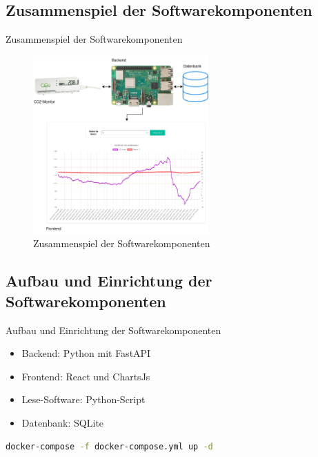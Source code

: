 \documentclass[10pt,ngerman]{beamer}
\begin{document}
\subsection{Zusammenspiel der Softwarekomponenten}

\begin{frame}[fragile]{Zusammenspiel der Softwarekomponenten}
  \begin{figure}
    \centering
    \captionsetup{justification=centering}
    \includegraphics[width=0.6\textwidth]{pictures/SoftwareZusammenspiel.png}
    \caption{Zusammenspiel der Softwarekomponenten \autocite{co2monitor}\autocite{rasPi}}
  \end{figure}
\end{frame}

\subsection{Aufbau und Einrichtung der Softwarekomponenten}

\begin{frame}[fragile]{Aufbau und Einrichtung der Softwarekomponenten}

  \begin{minipage}[t]{0.49\textwidth}
    \begin{itemize}
      \item Backend: Python mit FastAPI
      \item Frontend: React und ChartsJs
      \item Lese-Software: Python-Script
      \item Datenbank: SQLite
    \end{itemize}
  \end{minipage}

  \begin{lstlisting}[language=Bash]
    docker-compose -f docker-compose.yml up -d
  \end{lstlisting}
\end{frame}
\end{document}
